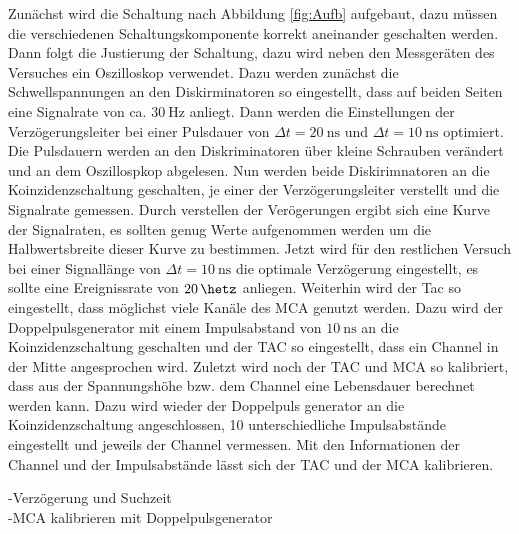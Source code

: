 	Zunächst wird die Schaltung nach Abbildung \ref{fig:Aufb} aufgebaut, dazu müssen die verschiedenen Schaltungskomponente korrekt aneinander geschalten werden.
	Dann folgt die Justierung der Schaltung, dazu wird neben den Messgeräten des Versuches ein Oszilloskop verwendet.
	Dazu werden zunächst die Schwellspannungen an den Diskirminatoren so eingestellt, dass auf beiden Seiten eine Signalrate von ca. $\SI{30}{\hertz}$ anliegt. 
    Dann werden die Einstellungen der Verzögerungsleiter bei einer Pulsdauer von $\Delta t= \SI{20}{\nano\second}$ und $\Delta t= \SI{10}{\nano\second}$ optimiert.
	Die Pulsdauern werden an den Diskriminatoren über kleine Schrauben verändert und an dem Oszillospkop abgelesen.
	Nun werden beide Diskirimnatoren an die Koinzidenzschaltung geschalten, je einer der Verzögerungsleiter verstellt und die Signalrate gemessen.
	Durch verstellen der Verögerungen ergibt sich eine Kurve der Signalraten, es sollten genug Werte aufgenommen werden um die Halbwertsbreite dieser Kurve zu bestimmen.
	Jetzt wird für den restlichen Versuch bei einer Signallänge von $\Delta t= \SI{10}{\nano\second}$ die optimale Verzögerung eingestellt, es sollte eine Ereignissrate von $\SI{20}{\hetz}$ anliegen.
	Weiterhin wird der Tac so eingestellt, dass möglichst viele Kanäle des MCA genutzt werden.
	Dazu wird der Doppelpulsgenerator mit einem Impulsabstand von $\SI{10}{\nano\second}$ an die Koinzidenzschaltung geschalten und der TAC so eingestellt, dass ein Channel in der Mitte angesprochen wird.
	Zuletzt wird noch der TAC und MCA so kalibriert, dass aus der Spannungshöhe bzw. dem Channel eine Lebensdauer berechnet werden kann.
	Dazu wird wieder der Doppelpuls generator an die Koinzidenzschaltung angeschlossen, 10 unterschiedliche Impulsabstände eingestellt und jeweils der Channel vermessen.
	Mit den Informationen der Channel und der Impulsabstände lässt sich der TAC und der MCA kalibrieren.

    -Verzögerung und Suchzeit \\
    -MCA kalibrieren mit Doppelpulsgenerator\\
